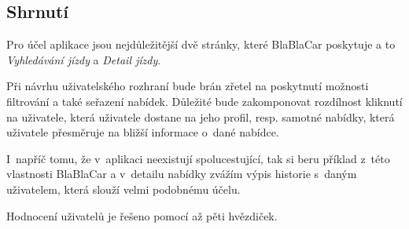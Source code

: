 
\newpage
\subsection{Shrnutí}
Pro účel aplikace jsou nejdůležitější dvě stránky, které BlaBlaCar poskytuje a to \textit{Vyhledávání jízdy} a \textit{Detail jízdy}.

Při návrhu uživatelského rozhraní bude brán zřetel na poskytnutí možnosti filtrování a také seřazení nabídek. Důležité bude zakomponovat rozdílnost kliknutí na uživatele, která uživatele dostane na jeho profil, resp. samotné nabídky, která uživatele přesměruje na bližší informace o~dané nabídce.

I~napříč tomu, že v~aplikaci neexistují spolucestující, tak si beru příklad z~této vlastnosti BlaBlaCar a v~detailu nabídky zvážím výpis historie s~daným uživatelem, která slouží velmi podobnému účelu.

Hodnocení uživatelů je řešeno pomocí až pěti hvězdiček.